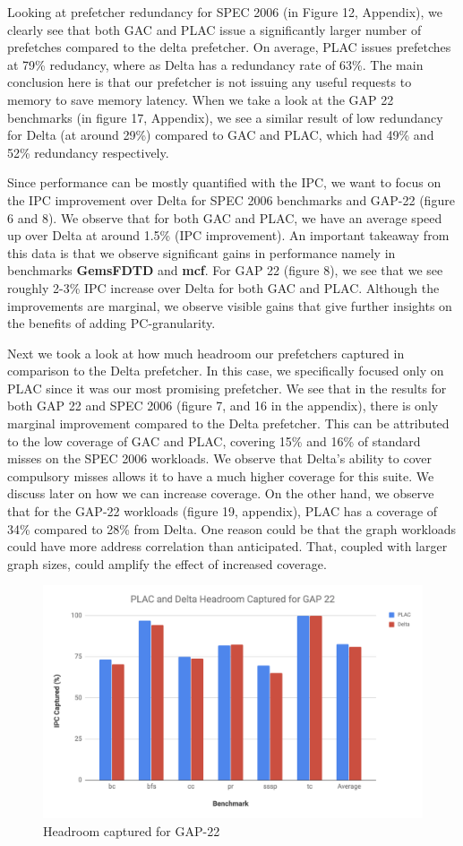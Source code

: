 \documentclass[conference]{IEEEtran}
\begin{document}
     Looking at prefetcher redundancy for SPEC 2006 (in Figure 12, Appendix), we clearly see that both GAC and PLAC issue a significantly larger number of prefetches compared to the delta prefetcher. On average, PLAC issues prefetches at 79\% redudancy, where as Delta has a redundancy rate of 63\%. The main conclusion here is that our prefetcher is not issuing any useful requests to memory to save memory latency. When we take a look at the GAP 22 benchmarks (in figure 17, Appendix), we see a similar result of low redundancy for Delta (at around 29\%) compared to GAC and PLAC, which had 49\% and 52\% redundancy respectively. 
     
    Since performance can be mostly quantified with the IPC, we want to focus on the IPC improvement over Delta for SPEC 2006 benchmarks and GAP-22 (figure 6 and 8). We observe that for both GAC and PLAC, we have an average speed up over Delta at around 1.5\% (IPC improvement). An important takeaway from this data is that we observe significant gains in performance namely in benchmarks \textbf{GemsFDTD} and \textbf{mcf}. For GAP 22 (figure 8), we see that we see roughly 2-3\% IPC increase over Delta for both GAC and PLAC. Although the improvements are marginal, we observe visible gains that give further insights on the benefits of adding PC-granularity.

    Next we took a look at how much headroom our prefetchers captured in comparison to the Delta prefetcher. In this case, we specifically focused only on PLAC since it was our most promising prefetcher. We see that in the results for both GAP 22 and SPEC 2006 (figure 7, and 16 in the appendix), there is only marginal improvement compared to the Delta prefetcher. This can be attributed to the low coverage of GAC and PLAC, covering 15\% and 16\% of standard misses on the SPEC 2006 workloads. We observe that Delta's ability to cover compulsory misses allows it to have a much higher coverage for this suite.  We discuss later on how we can increase coverage. On the other hand, we observe that for the GAP-22 workloads (figure 19, appendix), PLAC has a coverage of 34\% compared to 28\% from Delta. One reason could be that the graph workloads could have more address correlation than anticipated. That, coupled with larger graph sizes, could amplify the effect of increased coverage. 
    
    \begin{figure}[h]
        \centering
            \includegraphics[width=.5\textwidth]{gap_covered.png}
        \caption{Headroom captured for GAP-22}
    \end{figure}
\end{document}
